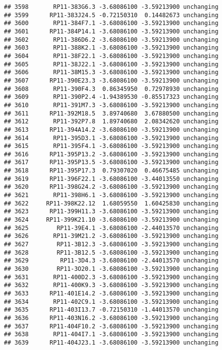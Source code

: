 \documentclass[]{article}
\begin{document}
\begin{verbatim}
## 3598       RP11-383G6.3 -3.68086100 -3.59213900 unchanging
## 3599      RP11-383J24.5 -0.72150310  0.14482673 unchanging
## 3600       RP11-384F7.1 -3.68086100 -3.59213900 unchanging
## 3601      RP11-384P14.1 -3.68086100 -3.59213900 unchanging
## 3602       RP11-386D6.2 -3.68086100 -3.59213900 unchanging
## 3603       RP11-388K2.1 -3.68086100 -3.59213900 unchanging
## 3604       RP11-38F22.1 -3.68086100 -3.59213900 unchanging
## 3605       RP11-38J22.1 -3.68086100 -3.59213900 unchanging
## 3606       RP11-38M15.3 -3.68086100 -3.59213900 unchanging
## 3607      RP11-390E23.3 -3.68086100 -3.59213900 unchanging
## 3608       RP11-390F4.3  0.86345950  0.72978930 unchanging
## 3609       RP11-390P2.4 -1.94389530 -0.85517323 unchanging
## 3610       RP11-391M7.3 -3.68086100 -3.59213900 unchanging
## 3611      RP11-392M18.5  3.89740680  3.67880500 unchanging
## 3612       RP11-392P7.8  1.89740680  2.08342620 unchanging
## 3613      RP11-394A14.2 -3.68086100 -3.59213900 unchanging
## 3614       RP11-395D3.1 -3.68086100 -3.59213900 unchanging
## 3615       RP11-395F4.1 -3.68086100 -3.59213900 unchanging
## 3616      RP11-395P13.2 -3.68086100 -3.59213900 unchanging
## 3617      RP11-395P13.5 -3.68086100 -3.59213900 unchanging
## 3618      RP11-395P17.3  0.79307020  0.46675485 unchanging
## 3619      RP11-396F22.1 -3.68086100 -3.44013550 unchanging
## 3620      RP11-398G24.2 -3.68086100 -3.59213900 unchanging
## 3621       RP11-398H6.1 -3.68086100 -3.59213900 unchanging
## 3622     RP11-398K22.12  1.68059550  1.60425830 unchanging
## 3623      RP11-399H11.3 -3.68086100 -3.59213900 unchanging
## 3624     RP11-399K21.10 -3.68086100 -3.59213900 unchanging
## 3625        RP11-39E4.1 -3.68086100 -2.44013570 unchanging
## 3626       RP11-39M21.2 -3.68086100 -3.59213900 unchanging
## 3627        RP11-3B12.3 -3.68086100 -3.59213900 unchanging
## 3628        RP11-3B12.5 -3.68086100 -3.59213900 unchanging
## 3629         RP11-3D4.3 -3.68086100 -2.44013570 unchanging
## 3630        RP11-3O20.1 -3.68086100 -3.59213900 unchanging
## 3631       RP11-400D2.3 -3.68086100 -3.59213900 unchanging
## 3632       RP11-400K9.3 -3.68086100 -3.59213900 unchanging
## 3633      RP11-401E14.2 -3.68086100 -3.59213900 unchanging
## 3634       RP11-402C9.1 -3.68086100 -3.59213900 unchanging
## 3635      RP11-403I13.7 -0.72150310 -1.44013570 unchanging
## 3636      RP11-403N16.2 -3.68086100 -3.59213900 unchanging
## 3637      RP11-404F10.2 -3.68086100 -3.59213900 unchanging
## 3638       RP11-404I7.1 -3.68086100 -3.59213900 unchanging
## 3639      RP11-404J23.1 -3.68086100 -3.59213900 unchanging

\end{verbatim}
\end{document}

